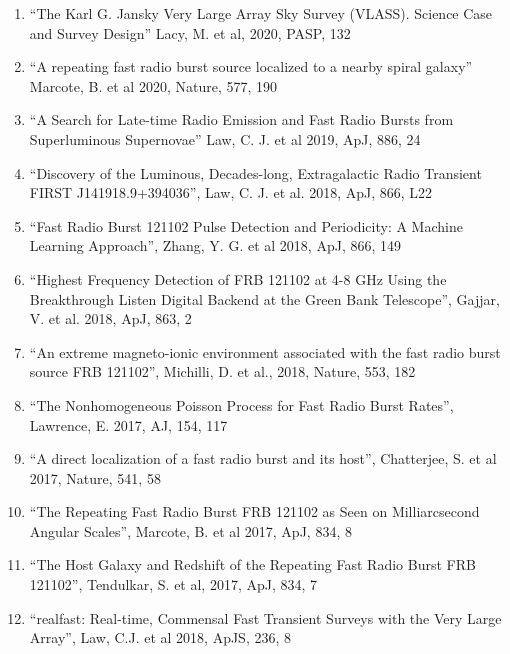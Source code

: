 \documentclass[11pt]{article}
\begin{document}
\begin{enumerate}
    \item ``The Karl G. Jansky Very Large Array Sky Survey (VLASS). Science Case and Survey Design'' Lacy, M. et al, 2020, PASP, 132

    \item ``A repeating fast radio burst source localized to a nearby spiral galaxy'' Marcote, B. et al 2020, Nature, 577, 190

    \item ``A Search for Late-time Radio Emission and Fast Radio Bursts from Superluminous Supernovae'' Law, C. J. et al 2019, ApJ, 886, 24
  
    \item ``Discovery of the Luminous, Decades-long, Extragalactic Radio Transient FIRST J141918.9+394036'', Law, C. J. et al. 2018, ApJ, 866, L22

    \item ``Fast Radio Burst 121102 Pulse Detection and Periodicity: A Machine Learning Approach'', Zhang, Y. G. et al 2018, ApJ, 866, 149

    \item ``Highest Frequency Detection of FRB 121102 at 4-8 GHz Using the Breakthrough Listen Digital Backend at the Green Bank Telescope'', Gajjar, V. et al. 2018, ApJ, 863, 2

    \item ``An extreme magneto-ionic environment associated with the fast radio burst source FRB 121102'', Michilli, D. et al., 2018, Nature, 553, 182
    
    \item ``The Nonhomogeneous Poisson Process for Fast Radio Burst Rates'', Lawrence, E. 2017, AJ, 154, 117
    
    \item ``A direct localization of a fast radio burst and its host'', Chatterjee, S. et al 2017, Nature, 541, 58
    
    \item ``The Repeating Fast Radio Burst FRB 121102 as Seen on Milliarcsecond Angular Scales'', Marcote, B. et al 2017, ApJ, 834, 8

    \item ``The Host Galaxy and Redshift of the Repeating Fast Radio Burst FRB 121102'', Tendulkar, S. et al, 2017, ApJ, 834, 7

    \item ``realfast: Real-time, Commensal Fast Transient Surveys with the Very Large Array'', Law, C.J. et al 2018, ApJS, 236, 8


\end{enumerate}
\end{document}
